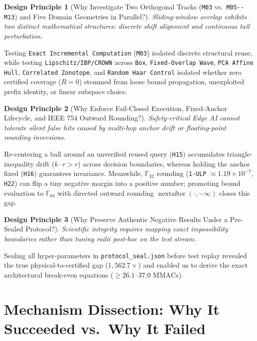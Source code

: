 \documentclass[11pt,a4paper]{article}
\newcommand{\F}{\mathbb{F}}
\newcommand{\code}[1]{{\small\ttfamily\nolinkurl{#1}}}
\newtheorem{principle}{Design Principle}[section]
\begin{document}
\begin{principle}[Why Investigate Two Orthogonal Tracks (\code{M03} vs.\ \code{M05--M13}) and Five Domain Geometries in Parallel?]
Sliding-window overlap exhibits two distinct mathematical structures: discrete shift alignment and continuous tail perturbation.
\end{principle}
Testing \code{Exact Incremental Computation} (\code{M03}) isolated discrete structural reuse, while testing \code{Lipschitz/IBP/CROWN} across \code{Box}, \code{Fixed-Overlap Wave}, \code{PCA Affine Hull}, \code{Correlated Zonotope}, and \code{Random Haar Control} isolated whether zero certified coverage ($R=0$) stemmed from loose bound propagation, unexploited prefix identity, or linear subspace choice.

\begin{principle}[Why Enforce Fail-Closed Execution, Fixed-Anchor Lifecycle, and IEEE 754 Outward Rounding?]
Safety-critical Edge AI cannot tolerate silent false hits caused by multi-hop anchor drift or floating-point rounding inversions.
\end{principle}
Re-centering a ball around an unverified reused query (\code{H15}) accumulates triangle-inequality drift ($k \cdot r > r$) across decision boundaries, whereas holding the anchor fixed (\code{H16}) guarantees invariance. Meanwhile, $\F_{32}$ rounding (\code{1-ULP} $\approx 1.19 \times 10^{-7}$, \code{H22}) can flip a tiny negative margin into a positive number; promoting bound evaluation to $\F_{64}$ with directed outward rounding $\operatorname{nextafter}(\cdot, -\infty)$ closes this gap.

\begin{principle}[Why Preserve Authentic Negative Results Under a Pre-Sealed Protocol?]
Scientific integrity requires mapping exact impossibility boundaries rather than tuning radii post-hoc on the test stream.
\end{principle}
Sealing all hyper-parameters in \code{protocol\_seal.json} before test replay revealed the true physical-to-certified gap ($1,562.7\times$) and enabled us to derive the exact architectural break-even equations ($\ge 26.1\text{--}37.0\text{ MMACs}$).

\section{Mechanism Dissection: Why It Succeeded vs.\ Why It Failed}
\end{document}
